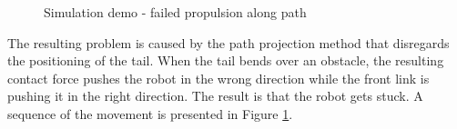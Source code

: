 \begin{figure}[H]
    \hfil

    \caption{Simulation demo - failed propulsion along path}
    \label{fig:case2-4}
\end{figure}

The resulting problem is caused by the path projection method that disregards the positioning of the tail. When the tail bends over an obstacle, the resulting contact force pushes the robot in the wrong direction while the front link is pushing it in the right direction. The result is that the robot gets stuck. A sequence of the movement is presented in Figure \ref{fig:case2-4}.


